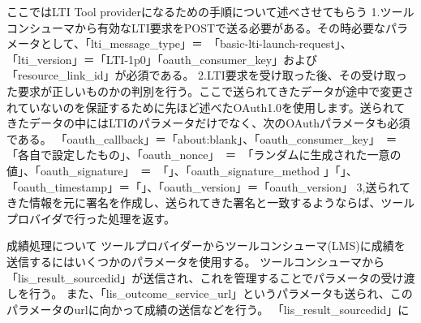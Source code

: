 ここではLTI Tool providerになるための手順について述べさせてもらう
1.ツールコンシューマから有効なLTI要求をPOSTで送る必要がある。その時必要なパラメータとして、「lti_message_type」＝　「basic-lti-launch-request」、「lti_version」＝「LTI-1p0」「oauth_consumer_key」および「resource_link_id」が必須である。
2.LTI要求を受け取った後、その受け取った要求が正しいものかの判別を行う。ここで送られてきたデータが途中で変更されていないのを保証するために先ほど述べたOAuth1.0を使用します。送られてきたデータの中にはLTIのパラメータだけでなく、次のOAuthパラメータも必須である。
「oauth_callback」＝「about:blank」、「oauth_consumer_key」　＝　「各自で設定したもの」、「oauth_nonce」　＝　「ランダムに生成された一意の値」、「oauth_signature」　＝　「」、「oauth_signature_method 」「」、「oauth_timestamp」＝「」、「oauth_version」＝「oauth_version」
3,送られてきた情報を元に署名を作成し、送られてきた署名と一致するようならば、ツールプロバイダで行った処理を返す。


成績処理について
ツールプロバイダーからツールコンシューマ(LMS)に成績を送信するにはいくつかのパラメータを使用する。
ツールコンシューマから「lis_result_sourcedid」が送信され、これを管理することでパラメータの受け渡しを行う。
また、「lis_outcome_service_url」というパラメータも送られ、このパラメータのurlに向かって成績の送信などを行う。
「lis_result_sourcedid」に
